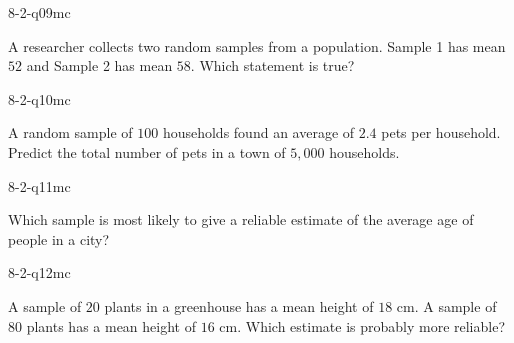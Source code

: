 \begin{practiceQuestion}{8-2-q09}{mc}
\begin{questionText}
A researcher collects two random samples from a population. Sample 1 has mean $52$ and Sample 2 has mean $58$. Which statement is true?
\end{questionText}
\end{practiceQuestion}

\begin{practiceQuestion}{8-2-q10}{mc}
\begin{questionText}
A random sample of $100$ households found an average of $2.4$ pets per household. Predict the total number of pets in a town of $5{,}000$ households.
\end{questionText}
\end{practiceQuestion}

\begin{practiceQuestion}{8-2-q11}{mc}
\begin{questionText}
Which sample is most likely to give a reliable estimate of the average age of people in a city?
\end{questionText}
\end{practiceQuestion}

\begin{practiceQuestion}{8-2-q12}{mc}
\begin{questionText}
A sample of $20$ plants in a greenhouse has a mean height of $18$ cm. A sample of $80$ plants has a mean height of $16$ cm. Which estimate is probably more reliable?
\end{questionText}
\end{practiceQuestion}

